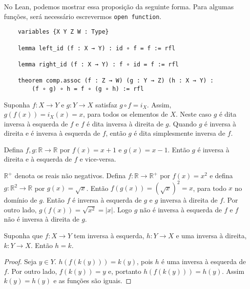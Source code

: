 No Lean, podemos mostrar essa proposição da seguinte forma. Para algumas funções, será necessário
escrevermos \lstinline{open function}.

\begin{lstlisting}
    variables {X Y Z W : Type}

    lemma left_id (f : X → Y) : id ∘ f = f := rfl

    lemma right_id (f : X → Y) : f ∘ id = f := rfl

    theorem comp.assoc (f : Z → W) (g : Y → Z) (h : X → Y) :
        (f ∘ g) ∘ h = f ∘ (g ∘ h) := rfl

\end{lstlisting}

\begin{definition}
    \label{def4}
    Suponha $f:X \to Y$ e $g : Y \to X$ satisfaz $g \circ f = i_X$. Assim,
    $g(f(x)) = i_X(x) = x$, para todos os elementos de $X$. Neste caso $g$ é dita inversa à esquerda
    de $f$ e $f$ é dita inversa à direita de $g$. Quando $g$ é inversa à direita e é inversa à esquerda
    de $f$, então $g$ é dita simplesmente inversa de $f$.
\end{definition}

\begin{example}
    \label{ex1}
    Defina $f,g : \mathbb{R} \to \mathbb{R}$ por $f(x) = x + 1$ e $g(x) = x - 1$. Então $g$
    é inversa à direita e à esquerda de $f$ e vice-versa.
\end{example}
\begin{example}
    \label{ex2}
    $\mathbb{R}^{+}$ denota os reais não negativos. Defina $f : \mathbb{R} \to \mathbb{R}^{+}$
    por $f(x) = x^2$ e defina $g : \mathbb{R}^2 \to \mathbb{R}$ por $g(x) = \sqrt{x}$. Então
    $f(g(x)) = (\sqrt{x})^2 = x$, para todo $x$ no domínio de $g$. Então $f$ é inversa à esquerda de $g$
    e $g$ inversa à direita de $f$. Por outro lado, $g(f(x)) = \sqrt{x^2} = |x|$. Logo $g$ não é inversa à
    esquerda de $f$ e $f$ não é inversa à direita de $g$.
\end{example}

\begin{theorem}
    \label{prop2}
    Suponha que $f : X \to Y $ tem inversa à esquerda, $h : Y \to X $ e uma inversa à direita, $k : Y \to X $.
    Então $h = k$.
\end{theorem}
\begin{proof}
    Seja $y \in Y$. $h(f(k(y))) = k(y)$, pois $h$ é uma inversa à esquerda de $f$.
    Por outro lado, $f(k(y)) = y$ e, portanto $h(f(k(y))) = h(y)$. Assim $k(y) = h(y) $ e as funções são iguais.
\end{proof}


